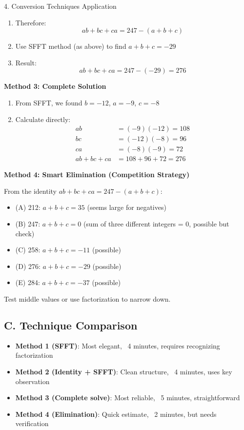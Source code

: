 \documentclass[12pt]{article}
\begin{document}
\begin{conversionbox}{4. Conversion Techniques Application}
\begin{enumerate}
    \item Therefore:
    \[ab + bc + ca = 247 - (a+b+c)\]
    
    \item Use SFFT method (as above) to find $a+b+c = -29$
    
    \item Result:
    \[ab + bc + ca = 247 - (-29) = 276\]
\end{enumerate}

\textbf{Method 3: Complete Solution}

\begin{enumerate}
    \item From SFFT, we found $b = -12$, $a = -9$, $c = -8$
    
    \item Calculate directly:
    \begin{align*}
    ab &= (-9)(-12) = 108\\
    bc &= (-12)(-8) = 96\\
    ca &= (-8)(-9) = 72\\
    ab + bc + ca &= 108 + 96 + 72 = 276
    \end{align*}
\end{enumerate}

\textbf{Method 4: Smart Elimination (Competition Strategy)}

From the identity $ab + bc + ca = 247 - (a+b+c)$:
\begin{itemize}
    \item (A) 212: $a+b+c = 35$ (seems large for negatives)
    \item (B) 247: $a+b+c = 0$ (sum of three different integers = 0, possible but check)
    \item (C) 258: $a+b+c = -11$ (possible)
    \item (D) 276: $a+b+c = -29$ (possible)
    \item (E) 284: $a+b+c = -37$ (possible)
\end{itemize}

Test middle values or use factorization to narrow down.

\subsection*{C. Technique Comparison}

\begin{itemize}
    \item \textbf{Method 1 (SFFT)}: Most elegant, ~4 minutes, requires recognizing factorization
    \item \textbf{Method 2 (Identity + SFFT)}: Clean structure, ~4 minutes, uses key observation
    \item \textbf{Method 3 (Complete solve)}: Most reliable, ~5 minutes, straightforward
    \item \textbf{Method 4 (Elimination)}: Quick estimate, ~2 minutes, but needs verification
\end{itemize}

\end{conversionbox}
\end{document}
